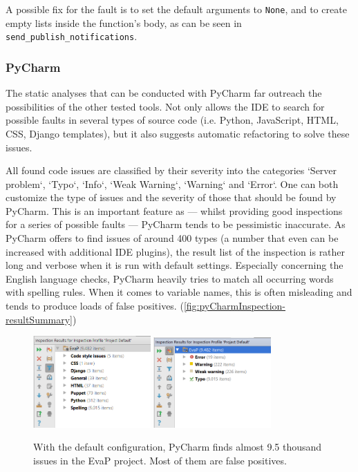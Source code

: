 A possible fix for the fault is to set the default arguments to \texttt{None}, and to create empty lists inside the function's body, as can be seen in \texttt{send\_publish\_notifications}.

\subsubsection{PyCharm}
The static analyses that can be conducted with PyCharm far outreach the possibilities of the other tested tools.
Not only allows the IDE to search for possible faults in several types of source code (i.e. Python, JavaScript, HTML, CSS, Django templates), but it also suggests automatic refactoring to solve these issues.

All found code issues are classified by their severity into the categories `Server problem`, `Typo`, `Info`, `Weak Warning`, `Warning` and `Error`.
One can both customize the type of issues and the severity of those that should be found by PyCharm.
This is an important feature as --- whilst providing good inspections for a series of possible faults --- PyCharm tends to be pessimistic inaccurate.
As PyCharm offers to find issues of around 400 types (a number that even can be increased with additional IDE plugins), the result list of the inspection is rather long and verbose when it is run with default settings.
Especially concerning the English language checks, PyCharm heavily tries to match all occurring words with spelling rules.
When it comes to variable names, this is often misleading and tends to produce loads of false positives. (\autoref{fig:pyCharmInspection-resultSummary})

\begin{figure}[h]
	\centering
	\includegraphics[width=0.4\textwidth]{graphics/pyCharmInspection-resultSummary}
	\includegraphics[width=0.4\textwidth]{graphics/pyCharmInspection-resultSummaryClassification}
	\caption{With the default configuration, PyCharm finds almost 9.5 thousand issues in the EvaP project. Most of them are false positives.}
	\label{fig:pyCharmInspection-resultSummary}
\end{figure}

